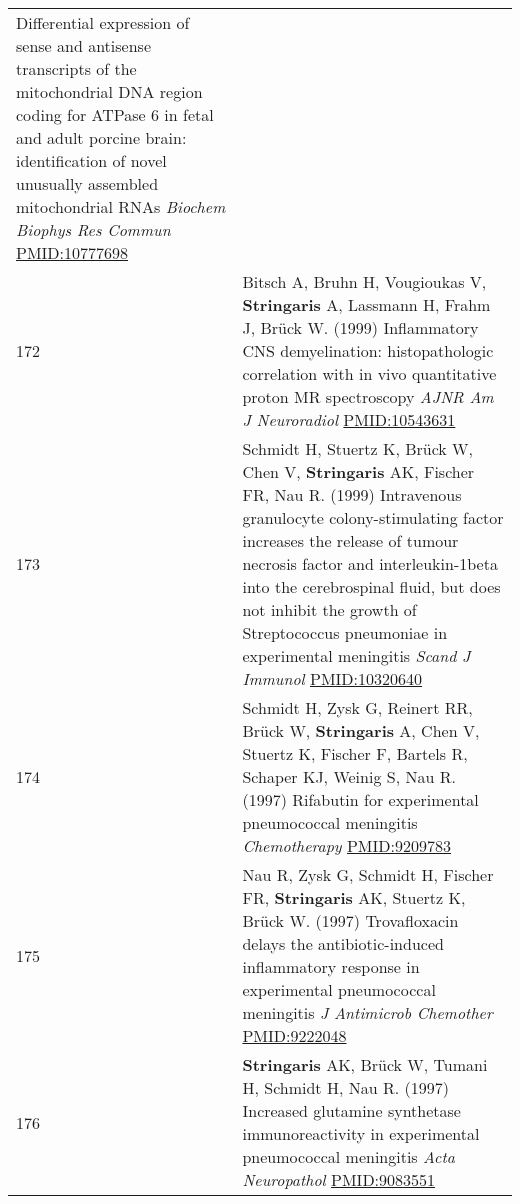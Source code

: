 \documentclass[
]{article}
\begin{document}
\begin{longtable}[]{@{}ll@{}}
\begin{minipage}[t]{0.94\columnwidth}
Differential expression of sense and antisense transcripts of the
mitochondrial DNA region coding for ATPase 6 in fetal and adult porcine
brain: identification of novel unusually assembled mitochondrial RNAs
\emph{Biochem Biophys Res Commun} \url{PMID:10777698}\strut
\end{minipage}\tabularnewline
\begin{minipage}[t]{0.01\columnwidth}\raggedright
172\strut
\end{minipage} & \begin{minipage}[t]{0.94\columnwidth}\raggedright
Bitsch A, Bruhn H, Vougioukas V, \textbf{Stringaris} A, Lassmann H,
Frahm J, Brück W. (1999) Inflammatory CNS demyelination: histopathologic
correlation with in vivo quantitative proton MR spectroscopy \emph{AJNR
Am J Neuroradiol} \url{PMID:10543631}\strut
\end{minipage}\tabularnewline
\begin{minipage}[t]{0.01\columnwidth}\raggedright
173\strut
\end{minipage} & \begin{minipage}[t]{0.94\columnwidth}\raggedright
Schmidt H, Stuertz K, Brück W, Chen V, \textbf{Stringaris} AK, Fischer
FR, Nau R. (1999) Intravenous granulocyte colony-stimulating factor
increases the release of tumour necrosis factor and interleukin-1beta
into the cerebrospinal fluid, but does not inhibit the growth of
Streptococcus pneumoniae in experimental meningitis \emph{Scand J
Immunol} \url{PMID:10320640}\strut
\end{minipage}\tabularnewline
\begin{minipage}[t]{0.01\columnwidth}\raggedright
174\strut
\end{minipage} & \begin{minipage}[t]{0.94\columnwidth}\raggedright
Schmidt H, Zysk G, Reinert RR, Brück W, \textbf{Stringaris} A, Chen V,
Stuertz K, Fischer F, Bartels R, Schaper KJ, Weinig S, Nau R. (1997)
Rifabutin for experimental pneumococcal meningitis \emph{Chemotherapy}
\url{PMID:9209783}\strut
\end{minipage}\tabularnewline
\begin{minipage}[t]{0.01\columnwidth}\raggedright
175\strut
\end{minipage} & \begin{minipage}[t]{0.94\columnwidth}\raggedright
Nau R, Zysk G, Schmidt H, Fischer FR, \textbf{Stringaris} AK, Stuertz K,
Brück W. (1997) Trovafloxacin delays the antibiotic-induced inflammatory
response in experimental pneumococcal meningitis \emph{J Antimicrob
Chemother} \url{PMID:9222048}\strut
\end{minipage}\tabularnewline
\begin{minipage}[t]{0.01\columnwidth}\raggedright
176\strut
\end{minipage} & \begin{minipage}[t]{0.94\columnwidth}\raggedright
\textbf{Stringaris} AK, Brück W, Tumani H, Schmidt H, Nau R. (1997)
Increased glutamine synthetase immunoreactivity in experimental
pneumococcal meningitis \emph{Acta Neuropathol} \url{PMID:9083551}\strut
\end{minipage}\tabularnewline
\bottomrule
\end{longtable}
\end{document}

